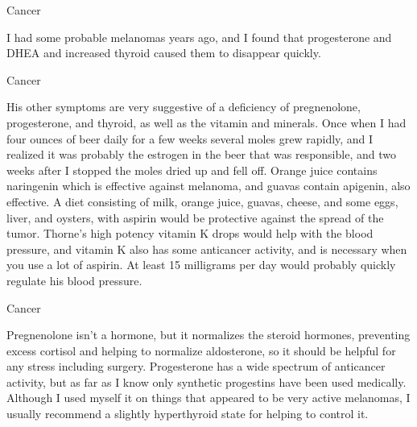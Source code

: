 \documentclass[11pt,oneside,openany,extrafontsizes]{memoir}
\begin{document}
\begin{standalonequote}{Cancer}

    \begin{answer}
        I had some probable melanomas years ago, and I found that progesterone and DHEA and increased thyroid caused them to disappear quickly.
    \end{answer}
\end{standalonequote}

\begin{standalonequote}{Cancer}

    \begin{answer}
        His other symptoms are very suggestive of a deficiency of pregnenolone, progesterone, and thyroid, as well as the vitamin and minerals. Once when I had four ounces of beer daily for a few weeks several moles grew rapidly, and I realized it was probably the estrogen in the beer that was responsible, and two weeks after I stopped the moles dried up and fell off. Orange juice contains naringenin which is effective against melanoma, and guavas contain apigenin, also effective. A diet consisting of milk, orange juice, guavas, cheese, and some eggs, liver, and oysters, with aspirin would be protective against the spread of the tumor. Thorne's high potency vitamin K drops would help with the blood pressure, and vitamin K also has some anticancer activity, and is necessary when you use a lot of aspirin. At least 15 milligrams per day would probably quickly regulate his blood pressure.
    \end{answer}
\end{standalonequote}

\begin{standalonequote}{Cancer}

    \begin{answer}
        Pregnenolone isn't a hormone, but it normalizes the steroid hormones, preventing excess cortisol and helping to normalize aldosterone, so it should be helpful for any stress including surgery. Progesterone has a wide spectrum of anticancer activity, but as far as I know only synthetic progestins have been used medically. Although I used myself it on things that appeared to be very active melanomas, I usually recommend a slightly hyperthyroid state for helping to control it.
    \end{answer}
\end{standalonequote}
\end{document}
